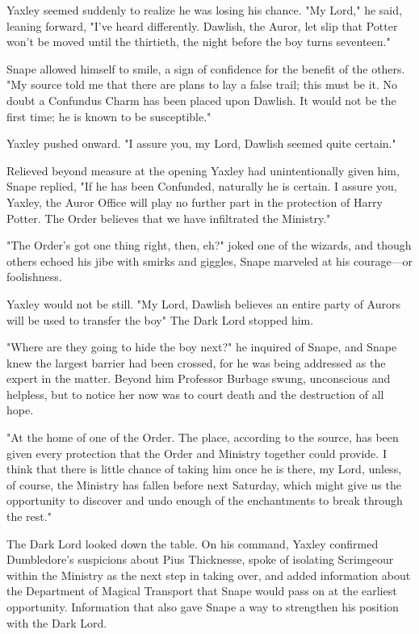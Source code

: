 Yaxley seemed suddenly to realize he was losing his chance. "My Lord," he said, leaning forward, "I've heard differently. Dawlish, the Auror, let slip that Potter won't be moved until the thirtieth, the night before the boy turns seventeen."

Snape allowed himself to smile, a sign of confidence for the benefit of the others. "My source told me that there are plans to lay a false trail; this must be it. No doubt a Confundus Charm has been placed upon Dawlish. It would not be the first time; he is known to be susceptible."

Yaxley pushed onward. "I assure you, my Lord, Dawlish seemed quite certain."

Relieved beyond measure at the opening Yaxley had unintentionally given him, Snape replied, "If he has been Confunded, naturally he is certain. I assure you, Yaxley, the Auror Office will play no further part in the protection of Harry Potter. The Order believes that we have infiltrated the Ministry."

"The Order's got one thing right, then, eh?" joked one of the wizards, and though others echoed his jibe with smirks and giggles, Snape marveled at his courage—or foolishness.

Yaxley would not be still. "My Lord, Dawlish believes an entire party of Aurors will be used to transfer the boy{\el}" The Dark Lord stopped him.

"Where are they going to hide the boy next?" he inquired of Snape, and Snape knew the largest barrier had been crossed, for he was being addressed as the expert in the matter. Beyond him Professor Burbage swung, unconscious and helpless, but to notice her now was to court death and the destruction of all hope.

"At the home of one of the Order. The place, according to the source, has been given every protection that the Order and Ministry together could provide. I think that there is little chance of taking him once he is there, my Lord, unless, of course, the Ministry has fallen before next Saturday, which might give us the opportunity to discover and undo enough of the enchantments to break through the rest."

The Dark Lord looked down the table. On his command, Yaxley confirmed Dumbledore's suspicions about Pius Thicknesse, spoke of isolating Scrimgeour within the Ministry as the next step in taking over, and added information about the Department of Magical Transport that Snape would pass on at the earliest opportunity. Information that also gave Snape a way to strengthen his position with the Dark Lord.

